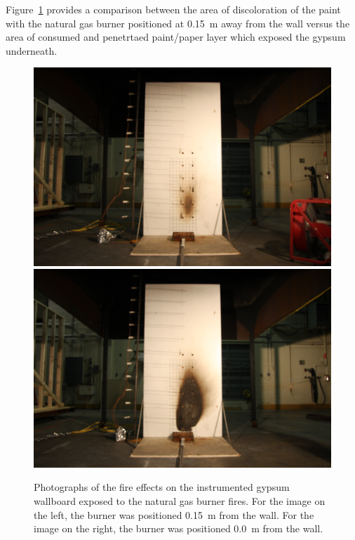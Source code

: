 \documentclass[twoside]{uocthesis}
\begin{document}
Figure~\ref{IWGB_NG_patterns} provides a comparison between the area of discoloration of the paint with the natural gas burner positioned at 0.15~m away from the wall versus the area of consumed and penetrtaed paint/paper layer which exposed the gypsum underneath.



\begin{figure}[p]
	\centering
	\includegraphics[trim=19.0in 5.0in 19.0in 15.0in, clip=true, width=0.4\columnwidth]{../Figures/IWGB_NG_0_15m}
	\includegraphics[trim=19.0in 5.0in 19.0in 15.0in, clip=true, width=0.4\columnwidth]{../Figures/IWGB_NG_0m} \\
	\caption[Photographs of the fire effects on the instrumented gypsum wallboard exposed to the natural gas burner fires]{Photographs of the fire effects on the instrumented gypsum wallboard exposed to the natural gas burner fires. For the image on the left, the burner was positioned 0.15~m from the wall.  For the image on the right, the burner was positioned 0.0~m from the wall.}
	\label{IWGB_NG_patterns}
\end{figure}
\end{document}
